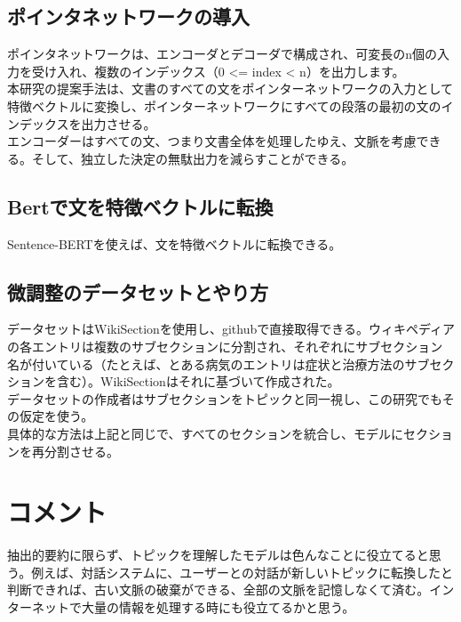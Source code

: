 \documentclass[a4paper]{article}
\begin{document}
\subsection{ポインタネットワークの導入}

ポインタネットワークは、エンコーダとデコーダで構成され、可変長のn個の入力を受け入れ、複数のインデックス（0 <= index < n）を出力します。\\

本研究の提案手法は、文書のすべての文をポインターネットワークの入力として特徴ベクトルに変換し、ポインターネットワークにすべての段落の最初の文のインデックスを出力させる。\\

エンコーダーはすべての文、つまり文書全体を処理したゆえ、文脈を考慮できる。そして、独立した決定の無駄出力を減らすことができる。\\

\subsection{Bertで文を特徴ベクトルに転換}

Sentence-BERTを使えば、文を特徴ベクトルに転換できる。

\subsection{微調整のデータセットとやり方}

データセットはWikiSectionを使用し、githubで直接取得できる。ウィキペディアの各エントリは複数のサブセクションに分割され、それぞれにサブセクション名が付いている（たとえば、とある病気のエントリは症状と治療方法のサブセクションを含む）。WikiSectionはそれに基づいて作成された。\\

データセットの作成者はサブセクションをトピックと同一視し、この研究でもその仮定を使う。\\

具体的な方法は上記と同じで、すべてのセクションを統合し、モデルにセクションを再分割させる。\\

\section{コメント}

抽出的要約に限らず、トピックを理解したモデルは色んなことに役立てると思う。例えば、対話システムに、ユーザーとの対話が新しいトピックに転換したと判断できれば、古い文脈の破棄ができる、全部の文脈を記憶しなくて済む。インターネットで大量の情報を処理する時にも役立てるかと思う。
\end{document}
